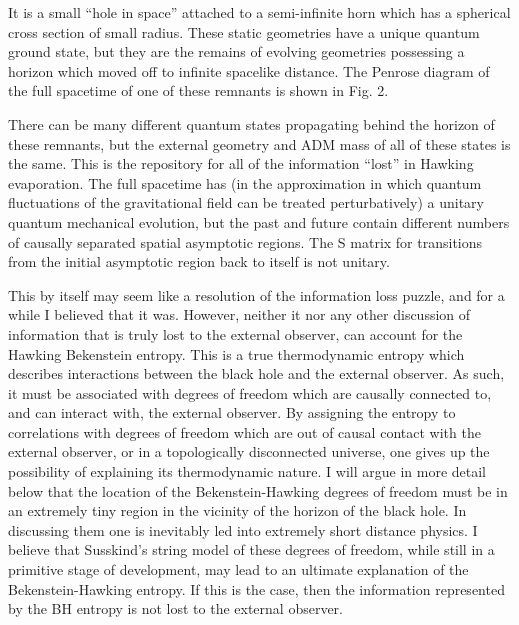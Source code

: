 \ifig{}
{\epsfysize=6cm }

 It is a small ``hole in space'' attached
to a semi-infinite horn which has a spherical cross section of small radius.
These static geometries have a unique quantum ground state, but they are the
remains
of evolving geometries possessing a horizon which moved off to infinite
spacelike
distance.  The Penrose diagram of the full spacetime of one of these remnants
is
shown in Fig. 2.

\ifig{}
{\epsfysize=6cm }

 There can be many different quantum states propagating behind the horizon
of these remnants, but the external geometry and ADM mass of all of these
states is
the same.  This is the repository for all of the information ``lost'' in
Hawking evaporation.
The full spacetime has (in the approximation in which quantum fluctuations of
the
gravitational field can be treated perturbatively) a unitary quantum mechanical
evolution, but the past and future contain different numbers of causally
separated
spatial asymptotic regions.  The S matrix for transitions from the initial
asymptotic
region back to itself is not unitary.

This by itself may seem like a resolution
of the information loss puzzle, and for a while I believed that it was.
However,
neither it nor any other discussion of information that is truly lost
to the external observer, can account
for the Hawking Bekenstein entropy.  This is a true thermodynamic entropy
which
describes interactions between the black hole and the external observer.
As such, it must be associated with degrees of freedom which are causally
connected to, and can interact with, the external observer.  By assigning the
entropy to correlations with degrees of freedom which are out of causal
contact with the external observer, or in a topologically disconnected
universe,
one gives up the possibility of explaining its thermodynamic nature.
I will argue in more detail below that the location of the
Bekenstein-Hawking degrees of freedom must be in an extremely tiny region in
the
vicinity of the horizon of the black hole.  In discussing them one is
inevitably
led into extremely short distance physics.  I believe that Susskind's string
model of these degrees of freedom, while still in a primitive stage of
development,
may lead to an ultimate explanation of the Bekenstein-Hawking entropy. If this
is the case, then the information represented by the BH entropy is not lost
to the external observer.

